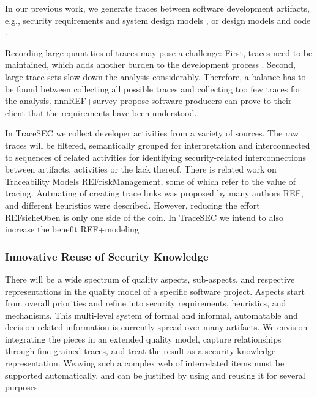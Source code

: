 In our previous work, we generate traces between software development artifacts, e.g., security requirements and system design models \cite{Houmb2009}, or design models and code \cite{Peldszus2019}.

Recording large quantities of traces may pose a challenge: First, traces need to be maintained, which adds another burden to the development process \cite{TraceMaintenance}. Second, large trace sets slow down the analysis considerably. Therefore, a balance has to be found between collecting all possible traces and collecting too few traces for the analysis. nnnREF+survey propose software producers can prove to their client that the requirements have been understood. 

In TraceSEC we collect developer activities from a variety of sources. The raw traces will be filtered, semantically grouped for interpretation and interconnected to sequences of related activities for identifying security-related interconnections between artifacts, activities or the lack thereof. There is related work on Traceability Models REFriskManagement, some of which refer to the value of tracing. Autmating of creating trace links was proposed by many authors REF, and different heuristics were described. However, reducing the effort REFsieheOben is only one side of the coin. In TraceSEC we intend to also increase the benefit REF+modeling 

\vspace{-0.5em}
\subsubsection*{Innovative Reuse of Security Knowledge}
\vspace{-1em}
There will be a wide spectrum of quality aspects, sub-aspects, and respective representations in the quality model of a specific software project. Aspects start from overall priorities and refine into security requirements, heuristics, and mechanisms. This multi-level system of formal and informal, automatable and decision-related information is currently spread over many artifacts. We envision integrating the pieces in an extended quality model, capture relationships through fine-grained traces, and treat the result as a security knowledge representation. Weaving such a complex web of interrelated items must be supported automatically, and can be justified by using and reusing it for several purposes.

